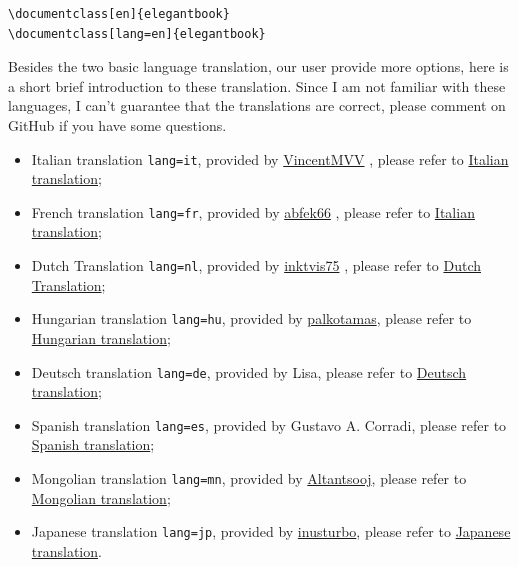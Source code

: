 \documentclass[11pt,bibtex]{elegantbook}
\begin{document}
\begin{lstlisting}
\documentclass[en]{elegantbook}
\documentclass[lang=en]{elegantbook}
\end{lstlisting}

Besides the two basic language translation, our user provide more options, here is a short brief introduction to these translation. Since I am not familiar with these languages, I can't guarantee that the translations are correct, please comment on GitHub if you have some questions.

\begin{itemize}
  \item Italian translation \lstinline{lang=it}, provided by \href{https://github.com/VincentMVV}{VincentMVV} , please refer to \href{https://github.com/ElegantLaTeX/ElegantBook/issues/85}{Italian translation};
  \item French translation \lstinline{lang=fr}, provided by \href{https://github.com/abfek66}{abfek66} , please refer to \href{https://github.com/ElegantLaTeX/ElegantBook/issues/85}{Italian translation};
  \item Dutch Translation \lstinline{lang=nl}, provided by \href{https://github.com/inktvis75}{inktvis75} , please refer to \href{https://github.com/ElegantLaTeX/ElegantBook/issues/108}{Dutch Translation};
  \item Hungarian translation \lstinline{lang=hu}, provided by \href{https://github.com/palkotamas}{palkotamas}, please refer to \href{https://github.com/ElegantLaTeX/ElegantBook/issues/111}{Hungarian translation};
  \item Deutsch translation \lstinline{lang=de}, provided by Lisa, please refer to \href{https://github.com/ElegantLaTeX/ElegantBook/issues/113}{Deutsch translation};
  \item Spanish translation \lstinline{lang=es}, provided by Gustavo A. Corradi, please refer to \href{https://github.com/ElegantLaTeX/ElegantBook/issues/133}{Spanish translation};
  \item Mongolian translation \lstinline{lang=mn}, provided by \href{https://github.com/Altantsooj}{Altantsooj}, please refer to \href{https://github.com/ElegantLaTeX/ElegantBook/issues/137}{Mongolian translation};
  \item Japanese translation \lstinline{lang=jp}, provided by \href{https://github.com/inusturbo}{inusturbo}, please refer to \href{https://github.com/ElegantLaTeX/ElegantBook/issues/172}{Japanese translation}.
\end{itemize}
\end{document}
